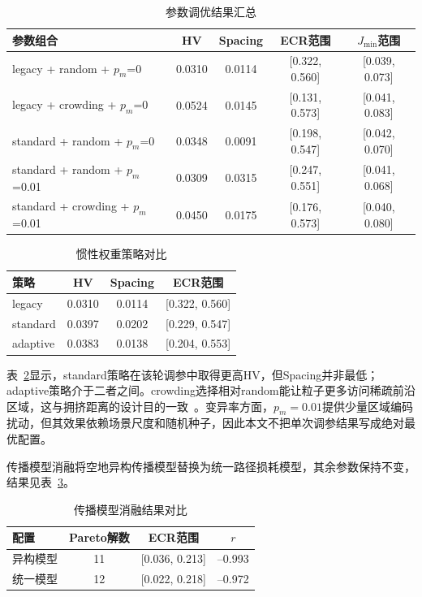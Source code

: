 \begin{table}[!htbp]
\centering
\caption{参数调优结果汇总}
\label{tab:tuning_summary}
\begin{tabular*}{\textwidth}{@{\extracolsep{\fill}}lcccc@{}}
\toprule
参数组合 & HV & Spacing & ECR范围 & $J_{\min}$范围 \\
\midrule
legacy + random + $p_m$=0 & 0.0310 & 0.0114 & [0.322, 0.560] & [0.039, 0.073] \\
legacy + crowding + $p_m$=0 & 0.0524 & 0.0145 & [0.131, 0.573] & [0.041, 0.083] \\
standard + random + $p_m$=0 & 0.0348 & 0.0091 & [0.198, 0.547] & [0.042, 0.070] \\
standard + random + $p_m$=0.01 & 0.0309 & 0.0315 & [0.247, 0.551] & [0.041, 0.068] \\
standard + crowding + $p_m$=0.01 & 0.0450 & 0.0175 & [0.176, 0.573] & [0.040, 0.080] \\
\bottomrule
\end{tabular*}
\end{table}

\begin{table}[!htbp]
\centering
\caption{惯性权重策略对比}
\label{tab:inertia_comparison}
\begin{tabular*}{\textwidth}{@{\extracolsep{\fill}}lccc@{}}
\toprule
策略 & HV & Spacing & ECR范围 \\
\midrule
legacy & 0.0310 & 0.0114 & [0.322, 0.560] \\
standard & 0.0397 & 0.0202 & [0.229, 0.547] \\
adaptive & 0.0383 & 0.0138 & [0.204, 0.553] \\
\bottomrule
\end{tabular*}
\end{table}

表~\ref{tab:inertia_comparison}显示，standard策略在该轮调参中取得更高HV，但Spacing并非最低；adaptive策略介于二者之间。crowding选择相对random能让粒子更多访问稀疏前沿区域，这与拥挤距离的设计目的一致~\cite{Deb2002,Raquel2005}。变异率方面，$p_m=0.01$提供少量区域编码扰动，但其效果依赖场景尺度和随机种子，因此本文不把单次调参结果写成绝对最优配置。

传播模型消融将空地异构传播模型替换为统一路径损耗模型，其余参数保持不变，结果见表~\ref{tab:ablation_prop}。

\begin{table}[!htbp]
\centering
\caption{传播模型消融结果对比}
\label{tab:ablation_prop}
\begin{tabular*}{\textwidth}{@{\extracolsep{\fill}}lccc@{}}
\toprule
配置 & Pareto解数 & ECR范围 & $r$ \\
\midrule
异构模型 & 11 & [0.036, 0.213] & --0.993 \\
统一模型 & 12 & [0.022, 0.218] & --0.972 \\
\bottomrule
\end{tabular*}
\end{table}

